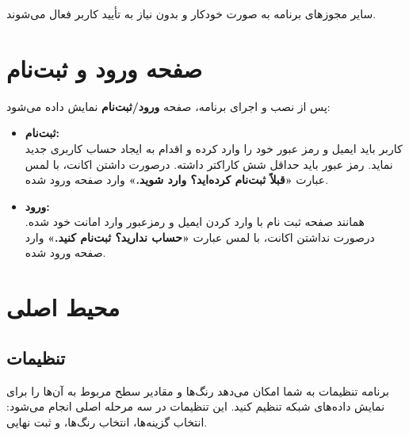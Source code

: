 \documentclass{report}
\begin{document}
سایر مجوزهای برنامه به صورت خودکار و بدون نیاز به تأیید کاربر فعال می‌شوند.

\section{صفحه ورود و ثبت‌نام}

پس از نصب و اجرای برنامه، صفحه \textbf{ورود/ثبت‌نام} نمایش داده می‌شود:

\begin{itemize}
	\item \textbf{ثبت‌نام:}\\
	کاربر باید ایمیل و رمز عبور خود را وارد کرده و اقدام به ایجاد حساب کاربری جدید نماید. رمز عبور باید حداقل شش کاراکتر داشته. درصورت داشتن اکانت، با لمس عبارت \textbf{«قبلاً ثبت‌نام کرده‌اید؟ وارد شوید.»} وارد صفحه ورود  شده.
	
	\item \textbf{ورود:}\\
	همانند صفحه ثبت نام با وارد کردن ایمیل و رمزعبور وارد امانت خود شده. درصورت نداشتن اکانت، با لمس عبارت \textbf{«حساب ندارید؟ ثبت‌نام کنید.»} وارد صفحه ورود  شده.
\end{itemize}

\section{محیط اصلی}

\subsection{تنظیمات}

برنامه تنظیمات به شما امکان می‌دهد رنگ‌ها و مقادیر سطح مربوط به آن‌ها را برای نمایش داده‌های شبکه تنظیم کنید. 
این تنظیمات در سه مرحله اصلی انجام می‌شود: انتخاب گزینه‌ها، انتخاب رنگ‌ها، و ثبت نهایی. 
\end{document}
